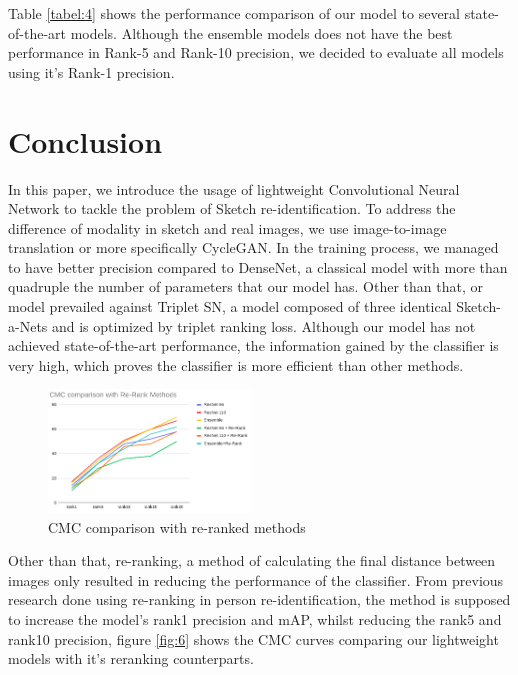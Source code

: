 \documentclass[conference]{IEEEtran}
\begin{document}
	
	Table \ref{tabel:4} shows the performance comparison of our model to several state-of-the-art models. Although the ensemble models does not have the best performance in Rank-5 and Rank-10 precision, we decided to evaluate all models using it's Rank-1 precision.
	
	\section{Conclusion}
	\vspace{1ex}
	
	In this paper, we introduce the usage of lightweight Convolutional Neural Network to tackle the problem of Sketch re-identification. To address the difference of modality in sketch and real images, we use image-to-image translation or more specifically CycleGAN. In the training process, we managed to have better precision compared to DenseNet, a classical model with more than quadruple the number of parameters that our model has. Other than that, or model prevailed against Triplet SN, a model composed of three identical Sketch-a-Nets and is optimized by triplet ranking loss. Although our model has not achieved state-of-the-art performance, the information gained by the classifier is very high, which proves the classifier is more efficient than other methods.
	
	\begin{figure}[h!] \centering
		\includegraphics[width=0.48\textwidth]{img/CMCrerank.png}
		\caption{CMC comparison with re-ranked methods}
		\label{fig:7}
	\end{figure}
	
	Other than that, re-ranking, a method of calculating the final distance between images only resulted in reducing the performance of the classifier. From previous research done using re-ranking in person re-identification, the method is supposed to increase the model's rank1 precision and mAP, whilst reducing the rank5 and rank10 precision, figure \ref{fig:6} shows the CMC curves comparing our lightweight models with it's reranking counterparts.
	
\end{document}
